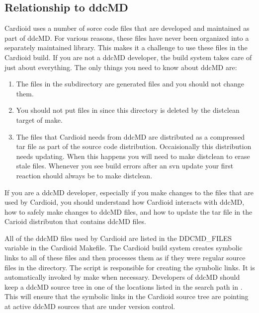 \documentclass{article}
\begin{document}
\subsection{Relationship to ddcMD}
\label{ssec:ddcMD}

Cardioid uses a number of sorce code files that are developed and
maintained as part of ddcMD.  For various reasons, these files have
never been organized into a separately maintained library.  This makes
it a challenge to use these files in the Cardioid build.  If you are not
a ddcMD developer, the build system takes care of just about everything.
The only things you need to know about ddcMD are:
\begin{enumerate}
\item The files in the  subdirectory are generated
  files and you should not change them.  
\item You should not put files in  since this
  directory is deleted by the distclean target of make.
\item The files that Cardioid needs from ddcMD are distributed as a
  compressed tar file as part of the source code distribution.
  Occaisionally this distribution needs updating.  When this happens you
  will need to make distclean to erase stale files.  Whenever you see
  build errors after an svn update your first reaction should always be
  to make distclean.
\end{enumerate}

If you are a ddcMD developer, especially if you make changes to the
files that are used by Cardioid, you should understand how Cardioid
interacts with ddcMD, how to safely make changes to ddcMD files, and how
to update the tar file in the Carioid distributon that contains ddcMD
files.

All of the ddcMD files used by Cardioid are listed in the DDCMD\_FILES
variable in the Cardioid Makefile.  The Cardioid build system creates
symbolic links to all of these files and then processes them as if they
were regular source files in the  directory.  The script
 is responsible for creating the symbolic links.
It is automatically invoked by make when necessary.  
Developers of ddcMD should keep a ddcMD source tree in one of the
locations listed in the search path in .  This
will ensure that the symbolic links in the Cardioid source tree are
pointing at active ddcMD sources that are under version control.
\end{document}
